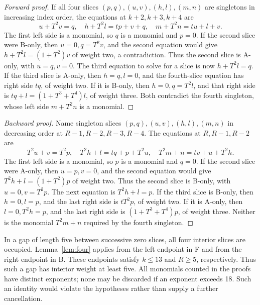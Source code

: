 \documentclass{article}
\begin{document}
\begin{proof}[Forward proof]
%
  If all four slices \((p,q),(u,v),(h,l),(m,n)\) are
  singletons in increasing index order, the equations at \(k+2,k+3,k+4\) are
  \begin{equation}
    u+T^2v=q, \quad h+T^2l=tp+v+q, \quad m+T^2n=tu+l+v.
  \end{equation}
  The first left side is a monomial, so \(q\) is a monomial and \(p=0\).
  If the second slice were B-only, then \(u=0,q=T^2v\), and the second
  equation would give \(h+T^2l=(1+T^2)v\) of weight two, a contradiction.
  Thus the second slice is A-only, with \(u=q,v=0\).
  The third equation to solve for a slice is now \(h+T^2l=q\).
  If the third slice is A-only, then \(h=q,l=0\), and the fourth-slice
  equation has right side \(tq\), of weight two. If it is B-only, then
  \(h=0,q=T^2l\), and that right side is
  \(tq+l=(1+T^3+T^4)l\), of weight three. Both contradict the fourth
  singleton, whose left side \(m+T^2n\) is a monomial.
\end{proof}

\begin{proof}[Backward proof]
  Name singleton slices \((p,q),(u,v),(h,l),(m,n)\) in
  decreasing order at \(R-1,R-2,R-3,R-4\). The equations at \(R,R-1,R-2\) are
  \begin{equation}
    T^2u+v=T^2p, \quad T^2h+l=tq+p+T^2u, \quad T^2m+n=tv+u+T^2h.
  \end{equation}
  The first left side is a monomial, so \(p\) is a monomial and \(q=0\).
  If the second slice were A-only, then \(u=p,v=0\), and the second equation
  would give \(T^2h+l=(1+T^2)p\) of weight two. Thus the second slice is
  B-only, with \(u=0,v=T^2p\). The next equation is \(T^2h+l=p\).
  If the third slice is B-only, then \(h=0,l=p\), and the last right side is
  \(tT^2p\), of weight two. If it is A-only, then \(l=0,T^2h=p\), and the
  last right side is \((1+T^3+T^4)p\), of weight three. Neither is the monomial
  \(T^2m+n\) required by the fourth singleton.
\end{proof}

In a gap of length five between successive zero slices, all four interior
slices are occupied. Lemma~\ref{lem:four} applies from the left endpoint in F
and from the right endpoint in B. These endpoints satisfy \(k\le 13\) and
\(R\ge 5\), respectively. Thus such a gap has interior weight at least five.
All monomials counted in the proofs have distinct exponents; none may be
discarded if an exponent exceeds 18. Such an identity would violate the
hypotheses rather than supply a further cancellation.
\end{document}
